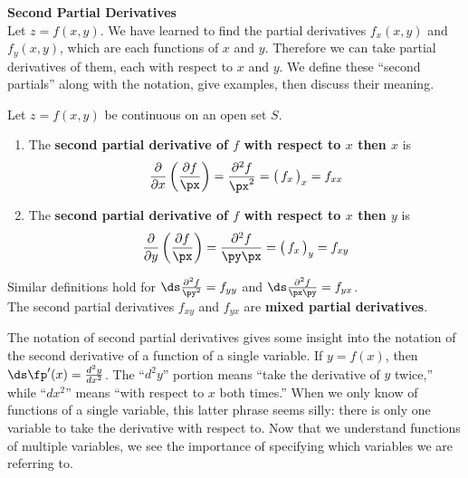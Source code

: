 \pagebreak

\noindent\textbf{\large Second Partial Derivatives}\\

Let $z=f(x,y)$. We have learned to find the partial derivatives $f_x(x,y)$ and $f_y(x,y)$, which are each functions of $x$ and $y$. Therefore we can take partial derivatives of them, each with respect to $x$ and $y$. We define these ``second partials'' along with the notation, give examples, then discuss their meaning.

{Let $z=f(x,y)$ be continuous on an open set $S$.
\begin{enumerate}
	\item The \textbf{second partial derivative of $f$ with respect to $x$ then $x$} is $$\frac{\partial}{\partial x}\left(\frac{\partial f}{\px}\right) = \frac{\partial^2 f}{\px^2} = \big(\,f_x\,\big)_x = f_{xx}$$

\item The \textbf{second partial derivative of $f$ with respect to $x$ then $y$} is $$\frac{\partial}{\partial y}\left(\frac{\partial f}{\px}\right) = \frac{\partial^2f}{\py\px} = \big(\,f_x\,\big)_y = f_{xy}$$

%

\end{enumerate}

Similar definitions hold for $\ds \frac{\partial^2f}{\py^2} = f_{yy}$ and $\ds \frac{\partial^2f}{\px\py} = f_{yx}$. \\

The second partial derivatives $f_{xy}$ and $f_{yx}$ are \textbf{mixed partial derivatives}.
}

The notation of second partial derivatives gives some insight into the notation of the second derivative of a function of a single variable. If $y=f(x)$, then $\ds \fp'(x) = \frac{d^2 y}{dx^2}$. The ``$d^2y$'' portion means ``take the derivative of $y$ twice,'' while ``$dx^2$'' means ``with respect to $x$ both times.'' When we only know of functions of a single variable, this latter phrase seems silly: there is only one variable to take the derivative with respect to. Now that we understand functions of multiple variables, we see the importance of specifying which variables we are referring to.\\


